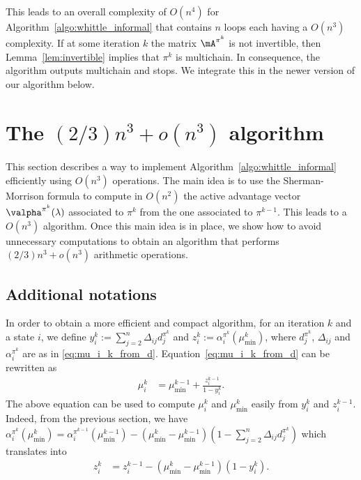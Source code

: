 This leads to an overall complexity of $O(n^4)$ for Algorithm~\ref{algo:whittle_informal} that contains $n$ loops each having a $O(n^3)$ complexity.
If at some iteration $k$ the matrix $\mA^{\pi^k}$ is not invertible, then Lemma~\ref{lem:invertible} implies that $\pi^k$ is multichain.
In consequence, the algorithm outputs multichain and stops.
We integrate this in the newer version of our algorithm below.

\section{The \texorpdfstring{$(2/3)n^3 + o(n^3)$}{2n3/3+o(n3)} algorithm}
\label{sec:formal_widx_algo}

This section describes a way to implement Algorithm~\ref{algo:whittle_informal}  efficiently using  $O(n^3)$ operations.
The main idea is to use the Sherman-Morrison formula to compute in $O(n^2)$ the active advantage vector $\valpha^{\pi^k}(\lambda)$ associated to $\pi^k$ from the one associated to $\pi^{k-1}$.
This leads to a $O(n^3)$ algorithm. Once this main idea is in place, we show how to avoid unnecessary computations to obtain an algorithm that performs $(2/3)n^3+o(n^3)$ arithmetic operations.

\subsection{Additional notations}

In order to obtain a more efficient and compact algorithm, for an iteration $k$ and a state $i$, we define $y^k_i:=\sum_{j=2}^n\Delta_{ij}d_j^{\pi^k}$ and $z^k_i:=\alpha^{\pi^k}_i(\mu^k_{\min})$, where $d_j^{\pi^k}$, $\Delta_{ij}$ and $\alpha^{\pi^k}_i$ are as in \eqref{eq:mu_i_k_from_d}.
Equation~\eqref{eq:mu_i_k_from_d} can be rewritten as
\begin{align}
    \mu_i^k &= \mu^{k-1}_{\min} +\displaystyle\frac{z_i^{k-1}}{1-y_i^k}.
    \label{eq:mu^k_i_from_y}
\end{align}
The above equation can be used to compute $\mu_i^k$ and $\mu^k_{\min}$ easily from $y^k_i$ and $z^{k-1}_i$. 
Indeed, from the previous section, we have $\alpha^{\pi^k}_i(\mu^k_{\min}) = \alpha^{\pi^{k-1}}_i(\mu^{k-1}_{\min}) -(\mu^k_{\min} -\mu^{k-1}_{\min})(1 -\sum_{j=2}^n\Delta_{ij}d_j^{\pi^k})$ which translates into
\begin{align}
    z^k_i &= z^{k-1}_i -(\mu^k_{\min} -\mu^{k-1}_{\min})(1 -y^k_i). \label{eq:z^k-i}
\end{align}

